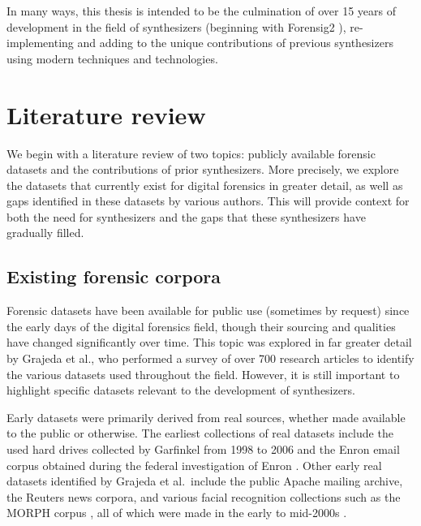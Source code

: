 \documentclass[letterpaper,12pt]{report}
\begin{document}
In many ways, this thesis is intended to be the culmination of over 15
years of development in the field of synthesizers (beginning with
Forensig2 \cite{mochForensicImageGenerator2009}), re-implementing
and adding to the unique contributions of previous synthesizers using
modern techniques and technologies.

\chapter{Literature review}\label{chapter-two}

We begin with a literature review of two topics: publicly available
forensic datasets and the contributions of prior synthesizers. More
precisely, we explore the datasets that currently exist for digital
forensics in greater detail, as well as gaps identified in these
datasets by various authors. This will provide context for both the need
for synthesizers and the gaps that these synthesizers have gradually
filled.

\section{Existing forensic
corpora}\label{existing-forensic-corpora}

Forensic datasets have been available for public use (sometimes by
request) since the early days of the digital forensics field, though
their sourcing and qualities have changed significantly over time. This
topic was explored in far greater detail by Grajeda et al., who
performed a survey of over 700 research articles to identify the various
datasets used throughout the field. However, it is still important to
highlight specific datasets relevant to the development of synthesizers.

Early datasets were primarily derived from real sources, whether made
available to the public or otherwise. The earliest collections of real
datasets include the used hard drives collected by Garfinkel from 1998
to 2006 and the Enron email corpus obtained during the federal
investigation of Enron \cite{garfinkelForensicCorporaChallenge2007}.
Other early real datasets identified by Grajeda et al.~include the
public Apache mailing archive, the Reuters news corpora, and various
facial recognition collections such as the MORPH corpus
\cite{ricanekMORPHLongitudinalImage2006}, all of which were made in
the early to mid-2000s
\cite{yannikosDataCorporaDigital2014,grajedaAvailabilityDatasetsDigital2017}.
\end{document}
